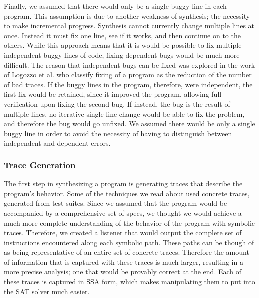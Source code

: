 \documentclass[]{article}
\begin{document}
Finally, we assumed that there would only be a single buggy line in each program.  This assumption is due to another weakness of synthesis; the necessity to make incremental progress.  Synthesis cannot currently change multiple lines at once.  Instead it must fix one line, see if it works, and then continue on to the others.  While this approach means that it is would be possible to fix multiple independent buggy lines of code, fixing dependent bugs would be much more difficult.  The reason that independent bugs can be fixed was explored in the work of Logozzo et al. who classify fixing of a program as the reduction of the number of bad traces.  If the buggy lines in the program, therefore, were independent, the first fix would be retained, since it improved the program, allowing full verification upon fixing the second bug.  If instead, the bug is the result of multiple lines, no iterative single line change would be able to fix the problem, and therefore the bug would go unfixed.  We assumed there would be only a single buggy line in order to avoid the necessity of having to distinguish between independent and dependent errors.

\subsubsection{Trace Generation}
The first step in synthesizing a program is generating traces that describe the program's behavior.  Some of the techniques we read about used concrete traces, generated from test suites.  Since we assumed that the program would be accompanied by a comprehensive set of specs, we thought we would achieve a much more complete understanding of the behavior of the program with symbolic traces.  Therefore, we created a listener that would output the complete set of instructions encountered along each symbolic path.  These paths can be though of as being representative of an entire set of concrete traces.  Therefore the amount of information that is captured with these traces is much larger, resulting in a more precise analysis; one that would be provably correct at the end.  Each of these traces is captured in SSA form, which makes manipulating them to put into the SAT solver much easier.
\end{document}
